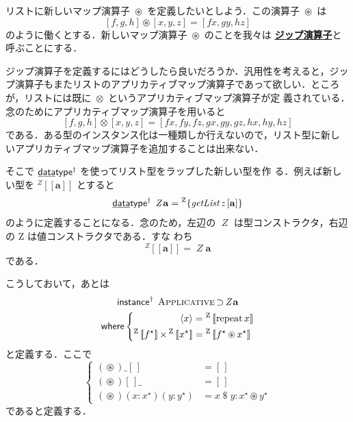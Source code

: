 \documentclass[a5paper,twoside,fleqn]{jsbook}
\def\[{\left[\!\left[}
\def\]{\right]\!\right]}
\newcommand{\keyword}[1]{{\underline{\textbf{#1}}}}
\newcommand{\mKeyword}[1]{\mathsf{#1}} %
\newcommand{\mKeywordUnderline}[1]{\text{\underline{\textsf{#1}}}} %
\newcommand{\mDataTypeKeyword}{\mKeywordUnderline{data}\mKeyword{type}}
\newcommand{\mInstanceKeyword}{\mKeyword{instance}}
\newcommand{\mWhereKeyword}{\mKeyword{where}}
\DeclareMathOperator{\mDataTypeParametric}{\mDataTypeKeyword^\dagger}
\DeclareMathOperator{\mInstanceParametric}{\mInstanceKeyword^{\dagger}}
\DeclareMathOperator{\mSuperSet}{\supset}
\DeclareMathOperator{\mWhere}{\mWhereKeyword}
\newcommand{\mEmptyList}{{[\,]}}
\newcommand{\mAnyParam}{\_}
\newcommand{\mFunc}[1]{\mathop{\mathit{#1}}}
\newcommand{\mSpecialFunc}[1]{\mathrm{#1}}
\DeclareMathOperator{\mGetList}{\mFunc{getList}}
\DeclareMathOperator{\mRepeat}{\mSpecialFunc{repeat}}
\DeclareMathOperator{\mApply}{\$}
\DeclareMathOperator{\mAppMap}{\times}
\DeclareMathOperator{\mAppMapList}{\otimes}
\DeclareMathOperator{\mIn}{{:\!:}}
\DeclareMathOperator{\mZip}{\circledast}
\newcommand{\mZipList}{Z}
\newcommand{\mType}[1]{\mathbf{#1}}
\newcommand{\mListType}[1]{[\mType{#1}]}
\newcommand{\mGenericTypeAssemble}[2]{{}^{\mTypeConstructor{#1}}\[\mType{#2}\]}
\newcommand{\mZipListType}[1]{\mGenericTypeAssemble{\mZipList}{#1}}
\newcommand{\mTypeConstructor}[1]{\textit{#1}}
\DeclareMathOperator{\mZipListTypeConstructor}{\mTypeConstructor{\mZipList}}
\newcommand{\mGenericValueConstructor}[1]{\mathrm{#1}}
\newcommand{\mGenericWith}[2]{{}^\mGenericValueConstructor{#1}\[#2\]}
\newcommand{\mGenericRecordWith}[2]{{}^\mGenericValueConstructor{#1}\{#2\}}
\newcommand{\mZipListWith}[1]{\mGenericWith{\mZipList}{#1}}
\newcommand{\mListWith}[1]{\left[#1\right]}
\newcommand{\mPureWith}[1]{\langle#1\rangle}
\newcommand{\mGenericTypeClass}[1]{\textsc{#1}} %
\newcommand{\mApplicativeTypeClass}{\mGenericTypeClass{Applicative}}
\newcommand{\mList}[1]{{#1}^\mathrm{\star}}
\begin{document}
リストに新しいマップ演算子 $\mZip$ を定義したいとしよう．この演算子
$\mZip$ は
\begin{equation}
\mListWith{f,g,h}\mZip\mListWith{x,y,z}=\mListWith{fx,gy,hz}
\end{equation}
のように働くとする．新しいマップ演算子 $\mZip$ のことを我々は
\keyword{ジップ演算子}と呼ぶことにする．

ジップ演算子を定義するにはどうしたら良いだろうか．汎用性を考えると，ジッ
プ演算子もまたリストのアプリカティブマップ演算子であって欲しい．ところ
が，リストには既に $\mAppMapList$ というアプリカティブマップ演算子が定
義されている．念のためにアプリカティブマップ演算子を用いると
\begin{equation}
\mListWith{f,g,h}\mAppMapList\mListWith{x,y,z}=\mListWith{fx,fy,fz,gx,gy,gz,hx,hy,hz}
\end{equation}
である．ある型のインスタンス化は一種類しか行えないので，リスト型に新し
いアプリカティブマップ演算子を追加することは出来ない．

そこで $\mDataTypeParametric$ を使ってリスト型をラップした新しい型を作
る．例えば新しい型を $\mZipListType{a}$ とすると
\begin{equation}
\label{eq:data-type-ziplist}
\mDataTypeParametric\;\mZipListTypeConstructor\mType{a}
=\mGenericRecordWith{\mZipList}{\mGetList\mIn{}\mListType{a}}
\end{equation}
のように定義することになる．念のため，左辺の
$\mZipListTypeConstructor$ は型コンストラクタ，右辺の
$\mGenericValueConstructor{\mZipList}$ は値コンストラクタである．すな
わち
\begin{equation}
\mZipListType{a}=\mZipListTypeConstructor\mType{a}
\end{equation}
である．

こうしておいて，あとは
\begin{multline}
\mInstanceParametric\;
\mApplicativeTypeClass\mSuperSet\mZipListTypeConstructor\mType{a}\\
\mWhere
\left\{
\begin{aligned}
\mPureWith{x}&=\mZipListWith{\mRepeat x}\\
\mZipListWith{\mList{f}}\mAppMap\mZipListWith{\mList{x}}
&=\mZipListWith{\mList{f}\mZip\mList{x}}
\end{aligned}
\right.
\end{multline}
と定義する．ここで
\begin{equation}
\label{eq:zip}
\left\{
\begin{aligned}
(\mZip)\mAnyParam\mEmptyList&=\mEmptyList\\
(\mZip)\mEmptyList\mAnyParam&=\mEmptyList\\
(\mZip)(x:\mList{x})(y:\mList{y})&=x\mApply y:\mList{x}\mZip\mList{y}
\end{aligned}
\right.
\end{equation}
であると定義する．
\end{document}
